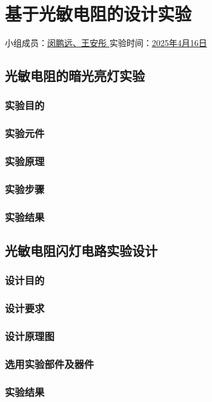 \section{基于光敏电阻的设计实验}

\begin{center}
    {
        小组成员：\underline{\quad 闵鹏远、王安彤 \quad} \quad
        实验时间：\underline{\quad 2025年4月16日 \quad}
    }
\end{center}
\subsection{光敏电阻的暗光亮灯实验}

\subsubsection{实验目的}

\subsubsection{实验元件}

\subsubsection{实验原理}

\subsubsection{实验步骤}

\subsubsection{实验结果}

\subsection{光敏电阻闪灯电路实验设计}

\subsubsection{设计目的}

\subsubsection{设计要求}

\subsubsection{设计原理图}

\subsubsection{选用实验部件及器件}

\subsubsection{实验结果}

\newpage